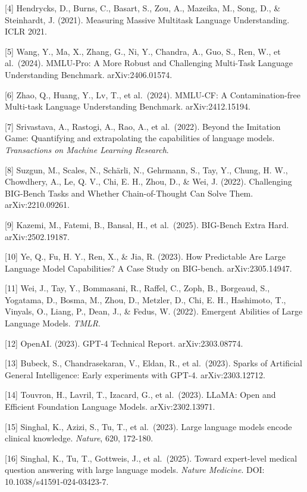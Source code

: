 {[}4{]} Hendrycks, D., Burns, C., Basart, S., Zou, A., Mazeika, M., Song, D., \& Steinhardt, J. (2021). Measuring Massive Multitask Language Understanding. ICLR 2021.

{[}5{]} Wang, Y., Ma, X., Zhang, G., Ni, Y., Chandra, A., Guo, S., Ren, W., et al.~(2024). MMLU-Pro: A More Robust and Challenging Multi-Task Language Understanding Benchmark. arXiv:2406.01574.

{[}6{]} Zhao, Q., Huang, Y., Lv, T., et al.~(2024). MMLU-CF: A Contamination-free Multi-task Language Understanding Benchmark. arXiv:2412.15194.

{[}7{]} Srivastava, A., Rastogi, A., Rao, A., et al.~(2022). Beyond the Imitation Game: Quantifying and extrapolating the capabilities of language models. \emph{Transactions on Machine Learning Research}.

{[}8{]} Suzgun, M., Scales, N., Schärli, N., Gehrmann, S., Tay, Y., Chung, H. W., Chowdhery, A., Le, Q. V., Chi, E. H., Zhou, D., \& Wei, J. (2022). Challenging BIG-Bench Tasks and Whether Chain-of-Thought Can Solve Them. arXiv:2210.09261.

{[}9{]} Kazemi, M., Fatemi, B., Bansal, H., et al.~(2025). BIG-Bench Extra Hard. arXiv:2502.19187.

{[}10{]} Ye, Q., Fu, H. Y., Ren, X., \& Jia, R. (2023). How Predictable Are Large Language Model Capabilities? A Case Study on BIG-bench. arXiv:2305.14947.

{[}11{]} Wei, J., Tay, Y., Bommasani, R., Raffel, C., Zoph, B., Borgeaud, S., Yogatama, D., Bosma, M., Zhou, D., Metzler, D., Chi, E. H., Hashimoto, T., Vinyals, O., Liang, P., Dean, J., \& Fedus, W. (2022). Emergent Abilities of Large Language Models. \emph{TMLR}.

{[}12{]} OpenAI. (2023). GPT-4 Technical Report. arXiv:2303.08774.

{[}13{]} Bubeck, S., Chandrasekaran, V., Eldan, R., et al.~(2023). Sparks of Artificial General Intelligence: Early experiments with GPT-4. arXiv:2303.12712.

{[}14{]} Touvron, H., Lavril, T., Izacard, G., et al.~(2023). LLaMA: Open and Efficient Foundation Language Models. arXiv:2302.13971.

{[}15{]} Singhal, K., Azizi, S., Tu, T., et al.~(2023). Large language models encode clinical knowledge. \emph{Nature}, 620, 172-180.

{[}16{]} Singhal, K., Tu, T., Gottweis, J., et al.~(2025). Toward expert-level medical question answering with large language models. \emph{Nature Medicine}. DOI: 10.1038/s41591-024-03423-7.

